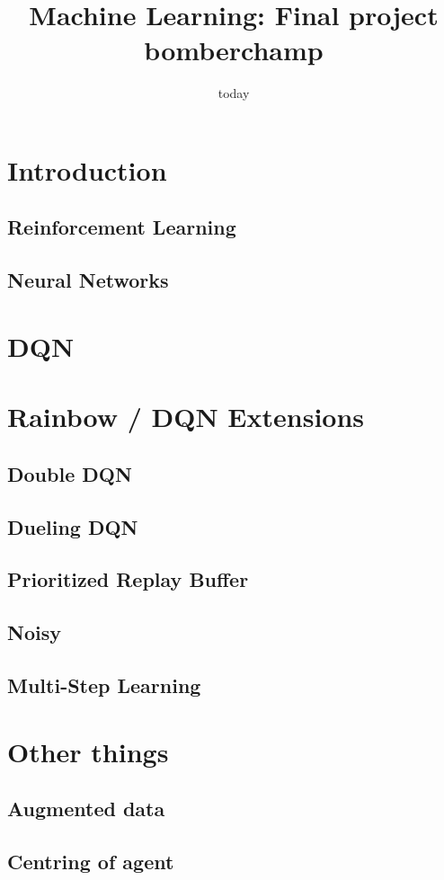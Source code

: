 \documentclass[12pt]{article}
\title{Machine Learning: Final project bomberchamp}
\date{today}
\begin{document}
\section{Introduction}

\subsection{Reinforcement Learning}

\subsection{Neural Networks}

\section{DQN}

\section{Rainbow / DQN Extensions}
\subsection{Double DQN} %
\subsection{Dueling DQN} %
\subsection{Prioritized Replay Buffer} %
\subsection{Noisy} %
\subsection{Multi-Step Learning} %
% 

\section{Other things}
\subsection{Augmented data}
\subsection{Centring of agent} %
\end{document}
